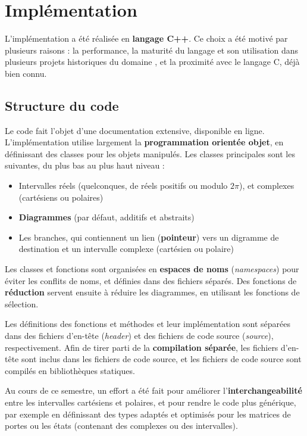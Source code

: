 \chapter{Implémentation}
\label{ch:Implementation}

L’implémentation a été réalisée en \textbf{langage C++}. Ce choix a été motivé par plusieurs raisons : la performance, la maturité du langage et son utilisation dans plusieurs projets historiques du domaine \cite{Bichsel_2023} \cite{QTranslator}, et la proximité avec le langage C, déjà bien connu.

\section{Structure du code}

Le code fait l'objet d'une documentation extensive, disponible en ligne. \cite{Leroy_doc}
L'implémentation utilise largement la \textbf{programmation orientée objet}, en définissant des classes pour les objets manipulés. Les classes principales sont les suivantes, du plus bas au plus haut niveau :
\begin{itemize}
  \item Intervalles réels (quelconques, de réels positifs ou modulo $2\pi$), et complexes (cartésiens ou polaires)
  \item \textbf{Diagrammes} (par défaut, additifs et abstraits)
  \item Les branches, qui contiennent un lien (\textbf{pointeur}) vers un digramme de destination et un intervalle complexe (cartésien ou polaire)
\end{itemize}

Les classes et fonctions sont organisées en \textbf{espaces de noms} (\textit{namespaces}) pour éviter les conflits de noms, et définies dans des fichiers séparés. Des fonctions de \textbf{réduction} servent ensuite à réduire les diagrammes, en utilisant les fonctions de sélection.

Les définitions des fonctions et méthodes et leur implémentation sont séparées dans des fichiers d'en-tête (\textit{header}) et des fichiers de code source (\textit{source}), respectivement. Afin de tirer parti de la \textbf{compilation séparée}, les fichiers d'en-tête sont inclus dans les fichiers de code source, et les fichiers de code source sont compilés en bibliothèques statiques.

Au cours de ce semestre, un effort a été fait pour améliorer l'\textbf{interchangeabilité} entre les intervalles cartésiens et polaires, et pour rendre le code plus générique, par exemple en définissant des types adaptés et optimisés pour les matrices de portes ou les états (contenant des complexes ou des intervalles).

